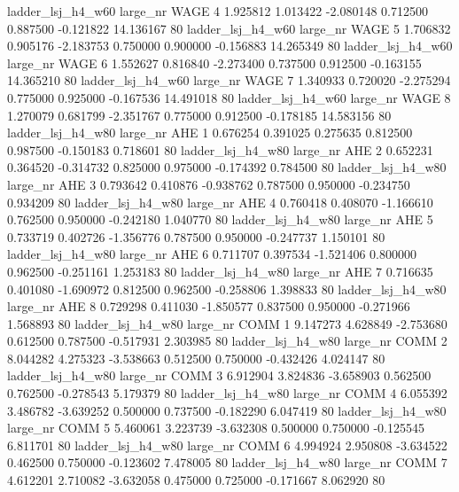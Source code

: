   ladder_lsj_h4_w60   large_nr     WAGE                 4  1.925812  1.013422  -2.080148 0.712500 0.887500 -0.121822   14.136167 80
  ladder_lsj_h4_w60   large_nr     WAGE                 5  1.706832  0.905176  -2.183753 0.750000 0.900000 -0.156883   14.265349 80
  ladder_lsj_h4_w60   large_nr     WAGE                 6  1.552627  0.816840  -2.273400 0.737500 0.912500 -0.163155   14.365210 80
  ladder_lsj_h4_w60   large_nr     WAGE                 7  1.340933  0.720020  -2.275294 0.775000 0.925000 -0.167536   14.491018 80
  ladder_lsj_h4_w60   large_nr     WAGE                 8  1.270079  0.681799  -2.351767 0.775000 0.912500 -0.178185   14.583156 80
  ladder_lsj_h4_w80   large_nr      AHE                 1  0.676254  0.391025   0.275635 0.812500 0.987500 -0.150183    0.718601 80
  ladder_lsj_h4_w80   large_nr      AHE                 2  0.652231  0.364520  -0.314732 0.825000 0.975000 -0.174392    0.784500 80
  ladder_lsj_h4_w80   large_nr      AHE                 3  0.793642  0.410876  -0.938762 0.787500 0.950000 -0.234750    0.934209 80
  ladder_lsj_h4_w80   large_nr      AHE                 4  0.760418  0.408070  -1.166610 0.762500 0.950000 -0.242180    1.040770 80
  ladder_lsj_h4_w80   large_nr      AHE                 5  0.733719  0.402726  -1.356776 0.787500 0.950000 -0.247737    1.150101 80
  ladder_lsj_h4_w80   large_nr      AHE                 6  0.711707  0.397534  -1.521406 0.800000 0.962500 -0.251161    1.253183 80
  ladder_lsj_h4_w80   large_nr      AHE                 7  0.716635  0.401080  -1.690972 0.812500 0.962500 -0.258806    1.398833 80
  ladder_lsj_h4_w80   large_nr      AHE                 8  0.729298  0.411030  -1.850577 0.837500 0.950000 -0.271966    1.568893 80
  ladder_lsj_h4_w80   large_nr     COMM                 1  9.147273  4.628849  -2.753680 0.612500 0.787500 -0.517931    2.303985 80
  ladder_lsj_h4_w80   large_nr     COMM                 2  8.044282  4.275323  -3.538663 0.512500 0.750000 -0.432426    4.024147 80
  ladder_lsj_h4_w80   large_nr     COMM                 3  6.912904  3.824836  -3.658903 0.562500 0.762500 -0.278543    5.179379 80
  ladder_lsj_h4_w80   large_nr     COMM                 4  6.055392  3.486782  -3.639252 0.500000 0.737500 -0.182290    6.047419 80
  ladder_lsj_h4_w80   large_nr     COMM                 5  5.460061  3.223739  -3.632308 0.500000 0.750000 -0.125545    6.811701 80
  ladder_lsj_h4_w80   large_nr     COMM                 6  4.994924  2.950808  -3.634522 0.462500 0.750000 -0.123602    7.478005 80
  ladder_lsj_h4_w80   large_nr     COMM                 7  4.612201  2.710082  -3.632058 0.475000 0.725000 -0.171667    8.062920 80
